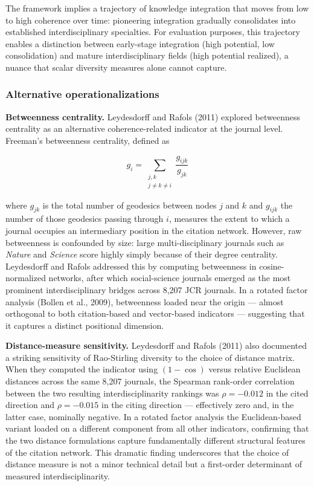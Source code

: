 \documentclass[
]{article}
\begin{document}
The framework implies a trajectory of knowledge integration that moves
from low to high coherence over time: pioneering integration gradually
consolidates into established interdisciplinary specialties. For
evaluation purposes, this trajectory enables a distinction between
early-stage integration (high potential, low consolidation) and mature
interdisciplinary fields (high potential realized), a nuance that scalar
diversity measures alone cannot capture.

\hypertarget{alternative-operationalizations}{%
\subsubsection{Alternative
operationalizations}\label{alternative-operationalizations}}

\textbf{Betweenness centrality.} Leydesdorff and Rafols (2011) explored
betweenness centrality as an alternative coherence-related indicator at
the journal level. Freeman's betweenness centrality, defined as

\[g_i = \sum_{\substack{j,k \\ j \neq k \neq i}}
        \frac{g_{ijk}}{g_{jk}}\]

where \(g_{jk}\) is the total number of geodesics between nodes \(j\)
and \(k\) and \(g_{ijk}\) the number of those geodesics passing through
\(i\), measures the extent to which a journal occupies an intermediary
position in the citation network. However, raw betweenness is confounded
by size: large multi-disciplinary journals such as \emph{Nature} and
\emph{Science} score highly simply because of their degree centrality.
Leydesdorff and Rafols addressed this by computing betweenness in
cosine-normalized networks, after which social-science journals emerged
as the most prominent interdisciplinary bridges across 8,207 JCR
journals. In a rotated factor analysis (Bollen et al., 2009),
betweenness loaded near the origin --- almost orthogonal to both
citation-based and vector-based indicators --- suggesting that it
captures a distinct positional dimension.

\textbf{Distance-measure sensitivity.} Leydesdorff and Rafols (2011)
also documented a striking sensitivity of Rao-Stirling diversity to the
choice of distance matrix. When they computed the indicator using
\((1 - \cos)\) versus relative Euclidean distances across the same 8,207
journals, the Spearman rank-order correlation between the two resulting
interdisciplinarity rankings was \(\rho = -0.012\) in the cited
direction and \(\rho = -0.015\) in the citing direction --- effectively
zero and, in the latter case, nominally negative. In a rotated factor
analysis the Euclidean-based variant loaded on a different component
from all other indicators, confirming that the two distance formulations
capture fundamentally different structural features of the citation
network. This dramatic finding underscores that the choice of distance
measure is not a minor technical detail but a first-order determinant of
measured interdisciplinarity.
\end{document}
